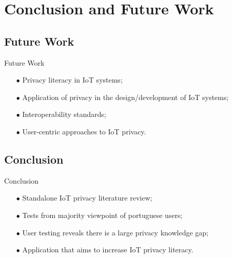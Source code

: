\documentclass[xcolor={svgnames},compress,aspectratio=169]{beamer}
\begin{document}
\section{Conclusion and Future Work}

\subsection{Future Work}

\begin{frame}{Future Work}
    \begin{itemize}
        \item[$\bullet$]
        Privacy literacy in IoT systems;
        \item[$\bullet$]
        Application of privacy in the design/development of IoT systems;
        \item[$\bullet$]
        Interoperability standards;
        \item[$\bullet$]
        User-centric approaches to IoT privacy.
    \end{itemize}
\end{frame}


\subsection{Conclusion}

\begin{frame}{Conclusion}
    \begin{itemize}
        \item[$\bullet$]
        Standalone IoT privacy literature review;
        \item[$\bullet$]
        Tests from majority viewpoint of portuguese users;
        \item[$\bullet$]
        User testing reveals there is a large privacy knowledge gap;
        \item[$\bullet$]
        Application that aims to increase IoT privacy literacy.
    \end{itemize}
\end{frame}
\end{document}
